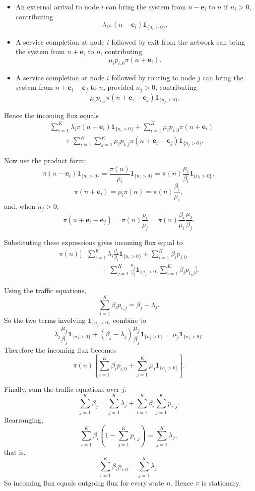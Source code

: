 \documentclass[11pt,a4paper]{article}
\newcommand{\1}{\mathbf{1}}
\newcommand{\ee}{\mathbf{e}}
\begin{document}
\begin{itemize}
  \item An external arrival to node $i$ can bring the system from $n-\ee_i$ to $n$ if $n_i>0$, contributing
  \[
  \lambda_i \pi(n-\ee_i)\1_{\{n_i>0\}}.
  \]
  \item A service completion at node $i$ followed by exit from the network can bring the system from $n+\ee_i$ to $n$, contributing
  \[
  \mu_i p_{i,0}\pi(n+\ee_i).
  \]
  \item A service completion at node $i$ followed by routing to node $j$ can bring the system from $n+\ee_i-\ee_j$ to $n$, provided $n_j>0$, contributing
  \[
  \mu_i p_{i,j}\pi(n+\ee_i-\ee_j)\1_{\{n_j>0\}}.
  \]
\end{itemize}

Hence the incoming flux equals
\begin{align*}
&\sum_{i=1}^K \lambda_i \pi(n-\ee_i)\1_{\{n_i>0\}}
+\sum_{i=1}^K \mu_i p_{i,0}\pi(n+\ee_i)\\
&\qquad
+\sum_{i=1}^K\sum_{j=1}^K \mu_i p_{i,j}\pi(n+\ee_i-\ee_j)\1_{\{n_j>0\}}.
\end{align*}

Now use the product form:
\[
\pi(n-\ee_i)\1_{\{n_i>0\}}=\frac{\pi(n)}{\rho_i}\1_{\{n_i>0\}}
=\pi(n)\frac{\mu_i}{\beta_i}\1_{\{n_i>0\}},
\]
\[
\pi(n+\ee_i)=\rho_i\pi(n)=\pi(n)\frac{\beta_i}{\mu_i},
\]
and, when $n_j>0$,
\[
\pi(n+\ee_i-\ee_j)
=\pi(n)\frac{\rho_i}{\rho_j}
=\pi(n)\frac{\beta_i}{\mu_i}\frac{\mu_j}{\beta_j}.
\]

Substituting these expressions gives incoming flux equal to
\begin{align*}
\pi(n)\Bigg[
&\sum_{i=1}^K \lambda_i\frac{\mu_i}{\beta_i}\1_{\{n_i>0\}}
+\sum_{i=1}^K \beta_i p_{i,0}\\
&\qquad
+\sum_{j=1}^K \frac{\mu_j}{\beta_j}\1_{\{n_j>0\}}
\sum_{i=1}^K \beta_i p_{i,j}
\Bigg].
\end{align*}

Using the traffic equations,
\[
\sum_{i=1}^K \beta_i p_{i,j}=\beta_j-\lambda_j.
\]
So the two terms involving $\1_{\{n_j>0\}}$ combine to
\[
\lambda_j\frac{\mu_j}{\beta_j}\1_{\{n_j>0\}}
+(\beta_j-\lambda_j)\frac{\mu_j}{\beta_j}\1_{\{n_j>0\}}
=\mu_j\1_{\{n_j>0\}}.
\]
Therefore the incoming flux becomes
\[
\pi(n)\left[\sum_{i=1}^K \beta_i p_{i,0}
+\sum_{j=1}^K \mu_j\1_{\{n_j>0\}}\right].
\]

Finally, sum the traffic equations over $j$:
\[
\sum_{j=1}^K \beta_j
=\sum_{j=1}^K \lambda_j+\sum_{i=1}^K \beta_i\sum_{j=1}^K p_{i,j}.
\]
Rearranging,
\[
\sum_{i=1}^K \beta_i\left(1-\sum_{j=1}^K p_{i,j}\right)
=\sum_{j=1}^K \lambda_j,
\]
that is,
\[
\sum_{i=1}^K \beta_i p_{i,0}=\sum_{j=1}^K \lambda_j.
\]
So incoming flux equals outgoing flux for every state $n$. Hence $\pi$ is stationary.
\end{document}
